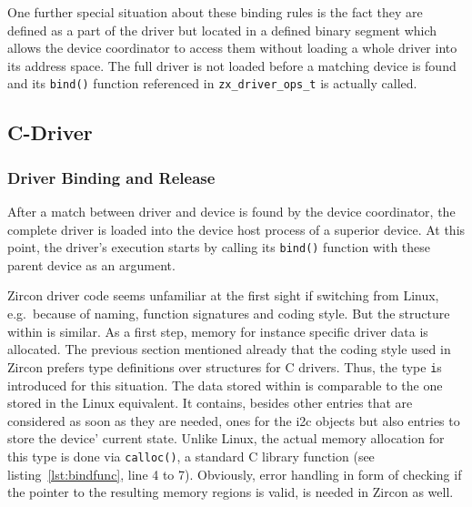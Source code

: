 One further special situation about these binding rules is the fact they are defined as a part of the driver but located in a defined binary segment which allows the device coordinator to access them without loading a whole driver into its address space.
The full driver is not loaded before a matching device is found and its \texttt{bind()} function referenced in \texttt{zx_driver_ops_t} is actually called.

\subsection{C-Driver}

\subsubsection{Driver Binding and Release}\label{sec:zircon:drv:bind}
After a match between driver and device is found by the device coordinator, the complete driver is loaded into the device host process of a superior device.
At this point, the driver's execution starts by calling its \texttt{bind()} function with these parent device as an argument.

Zircon driver code seems unfamiliar at the first sight if switching from Linux, e.g.\ because of naming, function signatures and coding style.
But the structure within is similar.
As a first step, memory for instance specific driver data is allocated.
The previous section mentioned already that the coding style used in Zircon prefers type definitions over structures for C drivers. 
Thus, the type \texttt is introduced for this situation.
The data stored within is comparable to the one stored in the Linux equivalent.
It contains, besides other entries that are considered as soon as they are needed, ones for the \ac{i2c} objects but also entries to store the device' current state.
Unlike Linux, the actual memory allocation for this type is done via \texttt{calloc()}, a standard C library function (see listing~\ref{lst:bindfunc}, line 4 to 7).
Obviously, error handling in form of checking if the pointer to the resulting memory regions is valid, is needed in Zircon as well.

